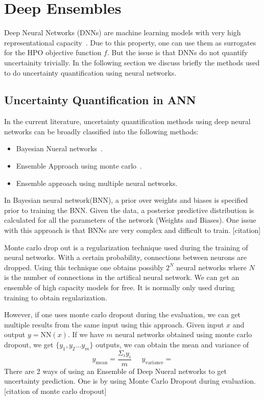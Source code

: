 \documentclass[11pt]{report}
\begin{document}
\section{Deep Ensembles}

Deep Neural Networks (DNNs) are machine learning models with very high representational capacity~\cite{Goodfellow-et-al-2016}.
Due to this property,  one can use them as surrogates for the HPO objective function $f$.
But the issue is that DNNs do not quantify uncertainity trivially.
In the following section we discuss briefly the methods used to do uncertainty quantification using neural networks.

\subsection{Uncertainty Quantification in ANN}

In the current literature,  uncertainty quantification methods using deep neural networks can be broadly classified into the following methods:
\begin{itemize}
\item Bayesian Nueral networks~\cite{Goan-2020}.
\item Ensemble Approach using monte carlo~\cite{JMLR:v15:srivastava14a}.
\item Ensemble approach using multiple neural networks.
\end{itemize}

In Bayesian neural network(BNN),  a prior over weights and biases is specified prior to training the BNN.
Given the data,  a posterior predictive distribution is calculated for all the parameters of the network (Weights and Biases).
One issue with this approach is that BNNs are very complex and difficult to train.  [citation]

Monte carlo drop out is a regularization technique used during the training of neural networks.
With a certain probability,  connections between neurons are dropped.
Using this technique one obtains possibly $2^N$ neural networks where $N$ is the number of connections
in the artifical neural network.
We can get an ensemble of high capacity models for free.
It is normally only used during training to obtain regularization.

However,  if one uses monte carlo dropout during the evaluation,  we can get multiple results from the same input using this approach.
Given input $x$ and output $y = \textrm{NN}(x)$.  If we have $m$ neural networks obtained using monte carlo dropout,  we get $\{y_1, y_2... y_m\}$ outputs,  we can obtain the mean and variance of 
$$
y_\textrm{mean} = \frac{\Sigma_i y_i}{m}  \;\;\;\;\;  y_\textrm{variance} = 
$$
There are 2 ways of using an Ensemble of Deep Nueral networks to get uncertainty prediction.
One is by using Monte Carlo Dropout during evaluation. [citation of monte carlo dropout]
\end{document}
